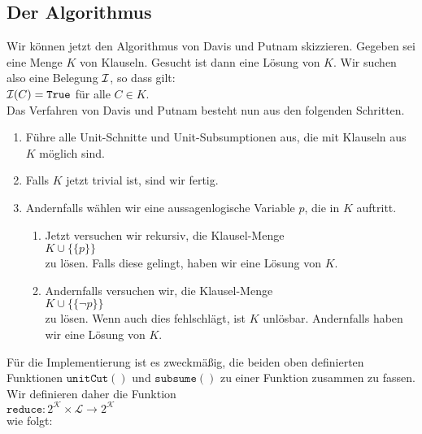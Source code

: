 \subsection{Der Algorithmus}
Wir können jetzt den Algorithmus von Davis und Putnam  skizzieren.
Gegeben sei eine Menge $K$ von Klauseln.  Gesucht ist dann eine Lösung von $K$.  Wir
suchen  also eine Belegung $\mathcal{I}$, so dass gilt: \\[0.2cm]
\hspace*{1.3cm} $\mathcal{I}(C) = \texttt{True}$ \quad für alle $C \in K$.\\[0.2cm]
Das Verfahren von Davis und Putnam besteht nun aus den folgenden Schritten.
\begin{enumerate}
\item Führe alle Unit-Schnitte und Unit-Subsumptionen aus, die mit Klauseln aus $K$ möglich sind.
\item Falls $K$ jetzt trivial ist, sind wir fertig.
\item Andernfalls wählen wir eine aussagenlogische Variable $p$, die in $K$ auftritt.
      \begin{enumerate}
      \item Jetzt versuchen  wir rekursiv,  die Klausel-Menge \\[0.2cm]
            \hspace*{1.3cm}  $K \cup \bigl\{\{p\}\bigr\}$ \\[0.2cm]
            zu lösen. Falls diese gelingt, haben wir eine Lösung von $K$.
      \item Andernfalls versuchen wir,  die Klausel-Menge \\[0.2cm]
            \hspace*{1.3cm} $K \cup \bigl\{\{\neg p\}\bigr\}$ \\[0.2cm]
            zu lösen.  Wenn auch dies fehlschlägt, ist $K$ unlösbar.  Andernfalls
            haben wir eine Lösung von $K$.
      \end{enumerate}
\end{enumerate}
Für die Implementierung ist es zweckmäßig, die beiden oben definierten Funktionen $\texttt{unitCut}()$ und
$\texttt{subsume}()$ zu einer Funktion zusammen zu fassen.  Wir definieren daher die Funktion
\\[0.2cm]
\hspace*{1.3cm}
$\texttt{reduce}: 2^\mathcal{K} \times \mathcal{L} \rightarrow 2^\mathcal{K}$
\\[0.2cm]
wie folgt: 
\\[0.2cm]
